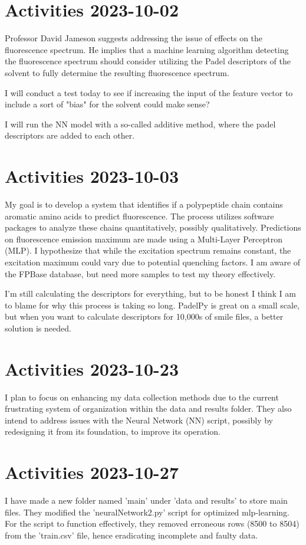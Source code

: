 \documentclass{article}
\begin{document}
\section{Activities 2023-10-02}
Professor David Jameson suggests addressing the issue of effects on the fluorescence spectrum. He implies that a machine learning algorithm detecting the fluorescence spectrum should consider utilizing the Padel descriptors of the solvent to fully determine the resulting fluorescence spectrum.

I will conduct a test today to see if increasing the input of the feature vector to include a sort of "bias" for the solvent could make sense?

I will run the NN model with a so-called additive method, where the padel descriptors are added to each other.

\section{Activities 2023-10-03}
My goal is to develop a system that identifies if a polypeptide chain contains aromatic amino acids to predict fluorescence. The process utilizes software packages to analyze these chains quantitatively, possibly qualitatively. Predictions on fluorescence emission maximum are made using a Multi-Layer Perceptron (MLP). I hypothesize that while the excitation spectrum remains constant, the excitation maximum could vary due to potential quenching factors. I am aware of the FPBase database, but need more samples to test my theory effectively.

I'm still calculating the descriptors for everything, but to be honest I think I am to blame for why this process is taking so long. PadelPy is great on a small scale, but when you want to calculate descriptors for 10,000s of smile files, a better solution is needed.


\section{Activities 2023-10-23}
I plan to focus on enhancing my data collection methods due to the current frustrating system of organization within the data and results folder. They also intend to address issues with the Neural Network (NN) script, possibly by redesigning it from its foundation, to improve its operation.

\section{Activities 2023-10-27}
I have made a new folder named 'main' under 'data and results' to store main files. They modified the 'neuralNetwork2.py' script for optimized mlp-learning. For the script to function effectively, they removed erroneous rows (8500 to 8504) from the 'train.csv' file, hence eradicating incomplete and faulty data.
\end{document}
